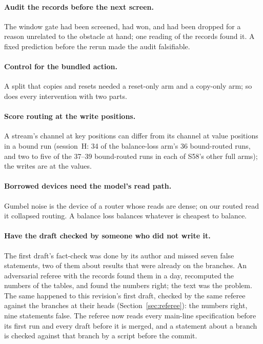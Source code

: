 \documentclass[11pt]{article}
\begin{document}
\paragraph{Audit the records before the next screen.} The window gate had been screened, had won, and had been dropped for a reason unrelated to the obstacle at hand; one reading of the records found it. A fixed prediction before the rerun made the audit falsifiable.

\paragraph{Control for the bundled action.} A split that copies and resets needed a reset-only arm and a copy-only arm; so does every intervention with two parts.

\paragraph{Score routing at the write positions.} A stream's channel at key positions can differ from its channel at value positions in a bound run (session~H: 34 of the balance-loss arm's 36 bound-routed runs, and two to five of the 37--39 bound-routed runs in each of S58's other full arms); the writes are at the values.

\paragraph{Borrowed devices need the model's read path.} Gumbel noise is the device of a router whose reads are dense; on our routed read it collapsed routing. A balance loss balances whatever is cheapest to balance.

\paragraph{Have the draft checked by someone who did not write it.} The first draft's fact-check was done by its author and missed seven false statements, two of them about results that were already on the branches. An adversarial referee with the records found them in a day, recomputed the numbers of the tables, and found the numbers right; the text was the problem. The same happened to this revision's first draft, checked by the same referee against the branches at their heads (Section~\ref{sec:referee}): the numbers right, nine statements false. The referee now reads every main-line specification before its first run and every draft before it is merged, and a statement about a branch is checked against that branch by a script before the commit.
\end{document}

